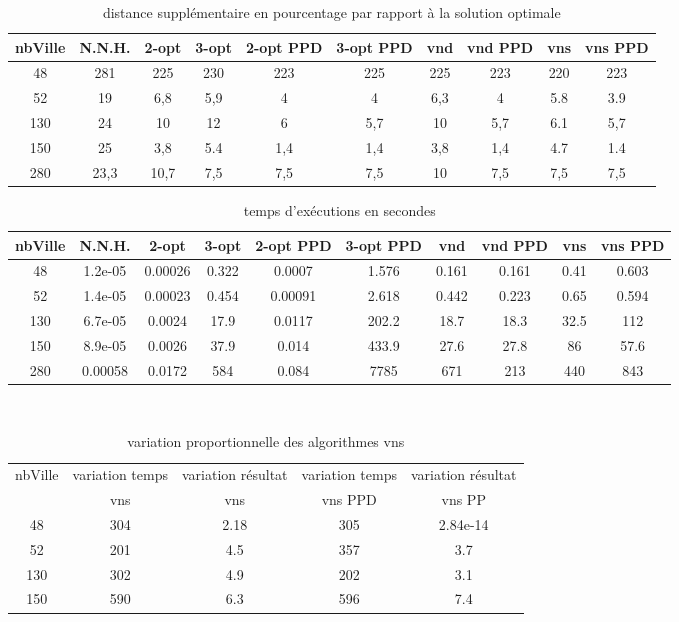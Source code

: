 \documentclass[12pt,a4paper]{article}
\begin{document}
\begin{table}[!h]
\centering
\begin{tabular}{|*{10}{c|}}
  \hline
  nbVille & N.N.H. & 2-opt & 3-opt & 2-opt PPD & 3-opt PPD & vnd & vnd PPD & vns & vns PPD \\
  \hline
  48 & 281 & 225 & 230 & 223 & 225 & 225 & 223 & 220 & 223 \\
  52 & 19 & 6,8 & 5,9 & 4 & 4 & 6,3 & 4 & 5.8 & 3.9 \\
  130 & 24 & 10 & 12 & 6 & 5,7 & 10 & 5,7 & 6.1 & 5,7 \\
  150 & 25 & 3,8 & 5.4 & 1,4 & 1,4 & 3,8 & 1,4 & 4.7 & 1.4 \\
  280 & 23,3 & 10,7 & 7,5 & 7,5 & 7,5 & 10 & 7,5 & 7,5 & 7,5 \\
  \hline
\end{tabular}
\caption{distance supplémentaire en pourcentage par rapport à la solution optimale}
\label{NNHpourcentageperf}
\end{table}

\begin{table}[!h]
\centering
\begin{tabular}{|*{10}{c|}}
  \hline
  nbVille & N.N.H. & 2-opt & 3-opt & 2-opt PPD & 3-opt PPD & vnd & vnd PPD & vns & vns PPD \\
  \hline
  48 & 1.2e-05 & 0.00026 & 0.322 & 0.0007 & 1.576 & 0.161 & 0.161 & 0.41 & 0.603 \\
  52 & 1.4e-05 & 0.00023 & 0.454 & 0.00091 & 2.618 & 0.442 & 0.223 & 0.65 & 0.594 \\
  130 & 6.7e-05 & 0.0024 & 17.9 & 0.0117 & 202.2 & 18.7 & 18.3 & 32.5 & 112 \\
  150 & 8.9e-05 & 0.0026 & 37.9 & 0.014 & 433.9 & 27.6 & 27.8 & 86 & 57.6 \\
  280 & 0.00058 & 0.0172 & 584 & 0.084 & 7785 & 671 & 213 & 440 & 843 \\ 
  \hline
\end{tabular}
\caption{temps d’exécutions en secondes}
\label{NNHtemps}
\end{table}
~\\
\begin{table}[!h]
\centering
\begin{tabular}{|*{5}{c|}}
  \hline
  nbVille & variation temps & variation résultat & variation temps & variation résultat \\
  ~ & vns & vns & vns PPD & vns PP \\
  \hline
  48 & 304 & 2.18 & 305 & 2.84e-14 \\ 
  52 & 201 & 4.5 & 357 & 3.7 \\
  130 & 302 & 4.9 & 202 & 3.1 \\
  150 & 590 & 6.3 & 596 & 7.4 \\
  \hline
\end{tabular}
\caption{variation proportionnelle des algorithmes vns}
\label{variationvnsNNH}
\end{table}
~\\
\end{document}
